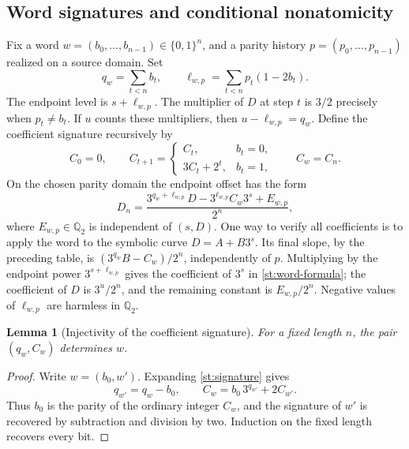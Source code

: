 \documentclass[11pt]{amsart}
\newtheorem{lemma}[theorem]{Lemma}
\theoremstyle{definition}
\theoremstyle{remark}
\newcommand{\Qtwo}{\mathbb Q_2}
\begin{document}
\subsection{Word signatures and conditional nonatomicity}
\label{st:words-subsection}

Fix a word $w=(b_0,\ldots,b_{n-1})\in\{0,1\}^n$, and a parity history
$p=(p_0,\ldots,p_{n-1})$ realized on a source domain.  Set
\[
 q_w=\sum_{t<n}b_t,\qquad
 \ell_{w,p}=\sum_{t<n}p_t(1-2b_t).
\]
The endpoint level is $s+\ell_{w,p}$.  The multiplier of $D$ at step $t$
is $3/2$ precisely when $p_t\ne b_t$.  If $u$ counts these multipliers,
then $u-\ell_{w,p}=q_w$.  Define the coefficient signature recursively by
\begin{equation}
 C_0=0,\qquad
 C_{t+1}=\begin{cases}C_t,&b_t=0,\\3C_t+2^t,&b_t=1,\end{cases}
 \qquad C_w=C_n.
 \label{st:signature}
\end{equation}
On the chosen parity domain the endpoint offset has the form
\begin{equation}
 D_n=\frac{3^{q_w+\ell_{w,p}}D
                   -3^{\ell_{w,p}}C_w3^s+E_{w,p}}{2^n},
 \label{st:word-formula}
\end{equation}
where $E_{w,p}\in\Qtwo$ is independent of $(s,D)$.  One way to verify
all coefficients is to apply the word to the symbolic curve $D=A+B3^s$.
Its final slope, by the preceding table, is
$(3^{q_w}B-C_w)/2^n$, independently of $p$.  Multiplying by the endpoint
power $3^{s+\ell_{w,p}}$ gives the coefficient of $3^s$ in
\eqref{st:word-formula}; the coefficient of $D$ is $3^u/2^n$, and the
remaining constant is $E_{w,p}/2^n$.  Negative values of $\ell_{w,p}$
are harmless in $\Qtwo$.

\begin{lemma}[Injectivity of the coefficient signature]\label{st:signature-injective}
For a fixed length $n$, the pair $(q_w,C_w)$ determines $w$.
\end{lemma}
\begin{proof}
Write $w=(b_0,w')$.  Expanding \eqref{st:signature} gives
\[
 q_{w'}=q_w-b_0,\qquad
 C_w=b_0\,3^{q_{w'}}+2C_{w'}.
\]
Thus $b_0$ is the parity of the ordinary integer $C_w$, and the signature
of $w'$ is recovered by subtraction and division by two.  Induction on
the fixed length recovers every bit.
\end{proof}
\end{document}

